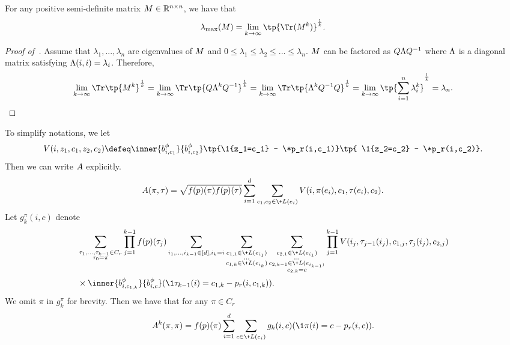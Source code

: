 \begin{lemma}\label{lem:clac_lammax}
    For any positive semi-definite matrix $\*M \in \mathbb R^{n\times n}$, we have that
    \[
        \lambda_{\max} (\*M) = \lim_{k\to \infty}
        \tp{\Tr(\*M^k)}^{\frac 1k}.
    \]
\end{lemma}
\begin{proof}[Proof of~]
    Assume that $\lambda_1,...,\lambda_n$ are eigenvalues of $\*M$ and $0\leq \lambda_1 \leq \lambda_2 \leq ... \leq \lambda_n$.
    $\*M$ can be factored as $\*Q\*\Lambda\*Q^{-1}$ where $\*\Lambda$ is a diagonal matrix satisfying $\*\Lambda(i,i) = \lambda_i$.
    Therefore,
    $$
        \lim_{k\to \infty}\Tr\tp{\*M^k}^{\frac 1k}
        = \lim_{k\to \infty}\Tr\tp{\*Q\*\Lambda^k\*Q^{-1}}^{\frac 1k}
        = \lim_{k\to \infty}\Tr\tp{\*\Lambda^k\*Q^{-1}\*Q}^{\frac 1k}
        = \lim_{k\to \infty} \tp{\sum_{i=1}^n \lambda_i^k}^{\frac 1k}
        =\lambda_n.
    $$
\end{proof}
To simplify notations, we let
\[
V(i,z_1,c_1,z_2,c_2) \defeq \inner{\*b_{i,c_1}^\phi}{\*b_{i,c_2}^\phi}
    \tp{\1{z_1=c_1} - \*p_r(i,c_1)}\tp{
    \1{z_2=c_2} - \*p_r(i,c_2)}.
\]
Then we can write $\*A$ explicitly.
\begin{equation}\label{eq:equation_A}
    \*A(\pi,\tau) = \sqrt{f(\*p)(\pi)f(\*p)(\tau)} \sum_{i=1}^d \sum_{c_1,c_2\in \+L(e_i)} V(i,\pi(e_i),c_1,\tau(e_i),c_2).
\end{equation}
Let $g_k^\pi(i,c)$ denote
\begin{align*}
    &\sum_{\substack{\tau_1,...,\tau_{k-1}\in C_r\\ \tau_0=\pi}} \prod_{j=1}^{k-1}f(\*p)(\tau_j)
    \sum_{i_1,...,i_{k-1}\in[d],i_k=i}
    \sum_{\substack{c_{1,1}\in \+L(e_{i_1})\\...\\c_{1,k}\in \+L(e_{i_k})}}
    \sum_{\substack{c_{2,1}\in \+L(e_{i_1})\\...\\c_{2,k-1}\in \+L(e_{i_{k-1})}\\c_{2,k}=c}}
    \prod_{j=1}^{k-1} V(i_j,\tau_{j-1}(i_j),c_{1,j},\tau_j(i_j),c_{2,j})
    \\&\times \inner{\*b_{i,c_{1,k}}^\phi}{\*b_{i,c}^\phi}(\1{\tau_{k-1}(i) = c_{1,k}} -  \*p_r(i,c_{1,k})).
\end{align*}
We omit $\pi$ in $g_k^\pi$ for brevity.
Then we have that for any $\pi \in C_r$
\begin{align}\label{eq:trace_of_A}
    \*A^k(\pi,\pi) = f(\*p)(\pi)\sum_{i=1}^d
    \sum_{c\in \+L(e_i)} g_k(i,c) (\1{\pi(i) = c} -  \*p_r(i,c)).
\end{align}
